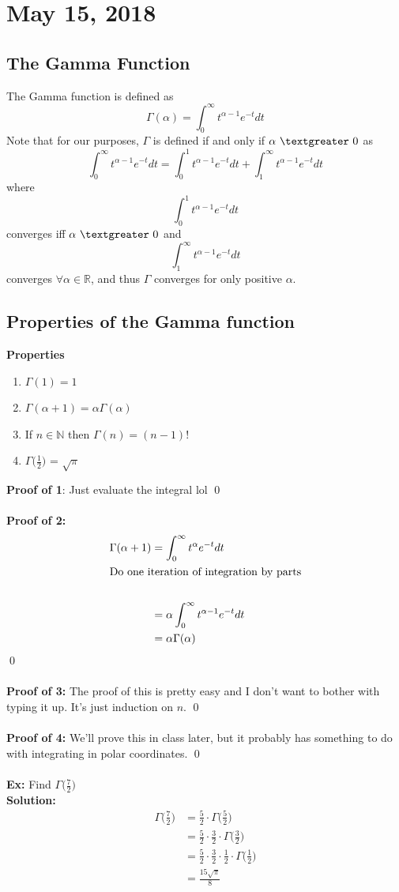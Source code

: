 \documentclass{article}
\newcommand{\N}{\mathbb{N}}
\newcommand{\R}{\mathbb{R}}
\newcommand{\gt}{\textgreater}
\newcommand{\x}{\cdot}
\newcommand{\Ga}{\Gamma}
\begin{document}

\section{May 15, 2018}
\subsection{The Gamma Function}
The Gamma function is defined as
\[\Ga(\alpha) = \int_{0}^{\infty} t^{\alpha-1}e^{-t} dt\]
Note that for our purposes, $\Ga$ is defined if and only if $\alpha\ \gt\ 0$ as
\[\int_{0}^{\infty} t^{\alpha-1}e^{-t} dt = \int_{0}^{1} t^{\alpha-1}e^{-t} dt + \int_{1}^{\infty} t^{\alpha-1}e^{-t} dt\]
where
\[\int_{0}^{1} t^{\alpha-1}e^{-t} dt\]
converges iff $\alpha\ \gt\ 0$
and
\[\int_{1}^{\infty} t^{\alpha-1}e^{-t} dt\]
converges $\forall \alpha \in \R$, and thus $\Ga$ converges for only positive $\alpha$.
\subsection{Properties of the Gamma function}
\textbf{Properties}
\begin{enumerate}
	\item $\Ga(1) = 1$
	\item $\Ga(\alpha + 1) = \alpha \Ga(\alpha)$
	\item If $n \in \N$ then $\Ga(n) = (n-1)!$
	\item $\Ga\big(\frac{1}{2}\big)$ = $\sqrt{\pi}$
\end{enumerate}
\textbf{Proof of 1}: Just evaluate the integral lol
\qed\\\\
\textbf{Proof of 2:}
\begin{align*}
	\Ga(\alpha +1) &= \int_{0}^{\infty} t^{\alpha}e^{-t} dt\\
	\intertext{Do one iteration of integration by parts}\\
				&= \alpha \int_{0}^{\infty} t^{\alpha-1}e^{-t} dt\\
				&= \alpha \Ga(\alpha)
\end{align*}
\qed\\\\
\textbf{Proof of 3:} The proof of this is pretty easy and I don't want to bother with typing it up. It's just induction on $n$.
\qed\\\\
\textbf{Proof of 4:} We'll prove this in class later, but it probably has something to do with integrating in polar coordinates. 
\qed\\\\
\textbf{Ex:} Find $\Ga\big(\frac{7}{2}\big)$\\
\textbf{Solution:}
\begin{align*}
	\Ga\bigg(\frac{7}{2}\bigg) &= \frac{5}{2}\x\Ga\bigg(\frac{5}{2}\bigg)\\
						&= \frac{5}{2}\x\frac{3}{2}\x\Ga\bigg(\frac{3}{2}\bigg)\\
						&= \frac{5}{2}\x\frac{3}{2}\x\frac{1}{2}\x\Ga\bigg(\frac{1}{2}\bigg)\\
						&= \frac{15\sqrt{\pi}}{8}
\end{align*}
\end{document}

